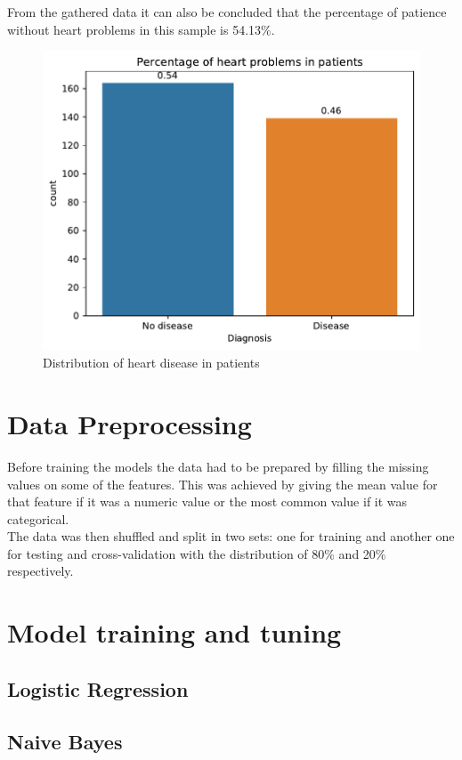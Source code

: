 \documentclass[conference]{IEEEtran}
\begin{document}
From the gathered data it can also be concluded that the percentage of patience without heart problems in this sample is 54.13\%.

\begin{figure}[htbp]
    \centerline{\includegraphics[width=0.7\linewidth]{images/percentage_general.pdf}}
    \caption{Distribution of heart disease in patients}
    \label{fig2}
\end{figure}

\section{Data Preprocessing}

Before training the models the data had to be prepared by filling the missing values on some of the features. This was achieved by giving the mean value for that feature if it was a numeric value or the most common value if it was categorical.\\
The data was then shuffled and split in two sets: one for training and another one for testing and cross-validation with the distribution of 80\% and 20\% respectively.

\section{Model training and tuning}

\subsection{Logistic Regression}

\subsection{Naive Bayes}
\end{document}
